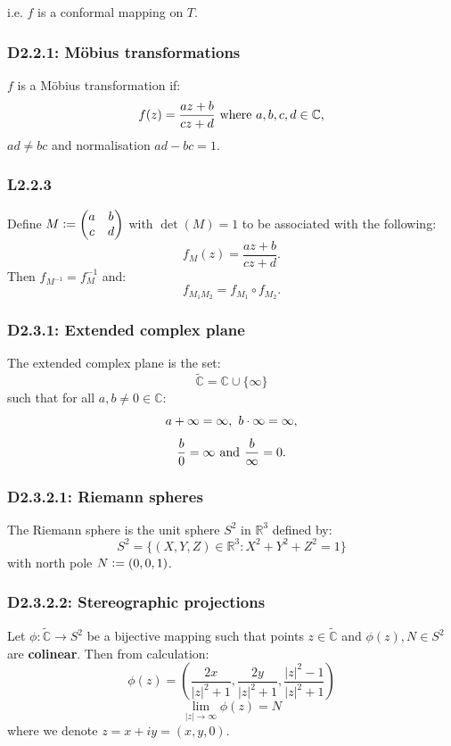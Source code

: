 \documentclass{article}
\newcommand{\deq}{\vcentcolon=}
\begin{document}
\begin{multicols*}{3}
i.e. $f$ is a conformal mapping on $T$.

\subsubsection*{D2.2.1: M\"obius transformations}
$f$ is a M\"obius transformation if:
$$f(z)=\frac{az+b}{cz+d}
\hspace{0.05in}\text{where $a,b,c,d\in\mathbb{C}$,}$$
$ad\neq bc$ and normalisation $ad-bc=1$.

\subsubsection*{L2.2.3}
Define $\displaystyle M\deq\begin{pmatrix}
a & b \\ c & d\end{pmatrix}$ with $\det(M)=1$
to be associated with the following:
$$f_M(z)=\frac{az+b}{cz+d}.$$
Then $f_{M^{-1}}=f^{-1}_M$ and:
$$f_{M_1 M_2}=f_{M_1}\circ f_{M_2}.$$

\subsubsection*{D2.3.1: Extended complex plane}
The extended complex plane is the set:
$$\widetilde{\mathbb{C}}=\mathbb{C}\cup\{\infty\}$$
such that for all $a,b\neq0\in\mathbb{C}$:
$$a+\infty=\infty,\hspace{0.05in}b\cdot\infty=\infty,$$
$$\frac{b}{0}=\infty\hspace{0.05in}\text{and}
\hspace{0.05in}\frac{b}{\infty}=0.$$

\subsubsection*{D2.3.2.1: Riemann spheres}
The Riemann sphere is the unit sphere $S^2$ in
$\mathbb{R}^3$ defined by:
$$S^2=\{(X,Y,Z)\in\mathbb{R}^3:
X^2+Y^2+Z^2=1\}$$
with north pole $N\deq(0,0,1)$.

\subsubsection*{D2.3.2.2: Stereographic projections}
Let $\phi:\widetilde{\mathbb{C}}\rightarrow S^2$ be a
bijective mapping such that points $z\in\widetilde{\mathbb{C}}$
and $\phi(z),N\in S^2$ are \textbf{colinear}.
Then from calculation:
$$\phi(z)=\left(\frac{2x}{|z|^2+1},
\frac{2y}{|z|^2+1},\frac{|z|^2-1}{|z|^2+1}\right)$$
$$\lim_{|z|\rightarrow\infty}\phi(z)=N$$
where we denote $z=x+iy=(x,y,0)$.


\end{multicols*}
\end{document}
